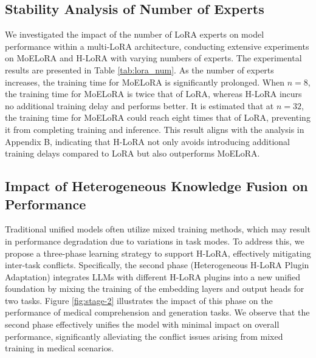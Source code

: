 \subsection{Stability Analysis of Number of Experts} 
We investigated the impact of the number of LoRA experts on model performance within a multi-LoRA architecture, conducting extensive experiments on MoELoRA and H-LoRA with varying numbers of experts. The experimental results are presented in Table \ref{tab:lora_num}. As the number of experts increases, the training time for MoELoRA is significantly prolonged. When \( n = 8 \), the training time for MoELoRA is twice that of LoRA, whereas H-LoRA incurs no additional training delay and performs better. It is estimated that at \( n = 32 \), the training time for MoELoRA could reach eight times that of LoRA, preventing it from completing training and inference. This result aligns with the analysis in Appendix B, indicating that H-LoRA not only avoids introducing additional training delays compared to LoRA but also outperforms MoELoRA.






\subsection{Impact of Heterogeneous Knowledge Fusion on Performance} 
Traditional unified models often utilize mixed training methods, which may result in performance degradation due to variations in task modes. To address this, we propose a three-phase learning strategy to support H-LoRA, effectively mitigating inter-task conflicts. Specifically, the second phase (Heterogeneous H-LoRA Plugin Adaptation) integrates LLMs with different H-LoRA plugins into a new unified foundation by mixing the training of the embedding layers and output heads for two tasks. Figure \ref{fig:stage-2} illustrates the impact of this phase on the performance of medical comprehension and generation tasks. We observe that the second phase effectively unifies the model with minimal impact on overall performance, significantly alleviating the conflict issues arising from mixed training in medical scenarios.


